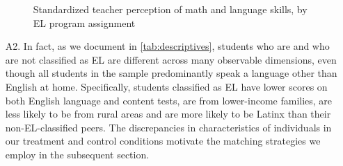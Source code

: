 \documentclass[a4paper, 11pt]{article}
\begin{document}
\begin{enumerate}
	\begin{figure}
		\begin{center}
			\caption{Standardized teacher perception of math and language skills, by EL program assignment} \label{fig:raw}
		\end{center}
	\end{figure}


	\item[A2.] In fact, as we document in \autoref{tab:descriptives}, students who are and who are not classified as EL are different across many observable dimensions, even though all students in the sample predominantly speak a language other than English at home. Specifically, students classified as EL have lower scores on both English language and content tests, are from lower-income families, are less likely to be from rural areas and are more likely to be Latinx than their non-EL-classified peers. The discrepancies in characteristics of individuals in our treatment and control conditions motivate the matching strategies we employ in the subsequent section. 


\end{enumerate}
\end{document}
